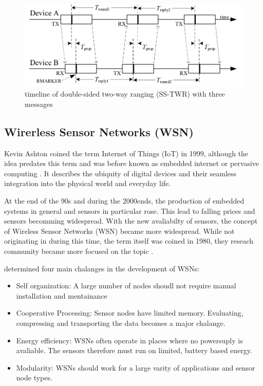 \begin{figure}[ht!]
\centering
\includegraphics[width=\linewidth]{graphics/schematics/TwoSidedRangingThreeMessages.PNG}
\caption{timeline of double-sided two-way ranging (SS-TWR) with three messages\cite{IEEE4z}}
\label{f:ds_twr_3}
\end{figure}


\subsection{Wirerless Sensor Networks (WSN)}
\label{S:WSN}
Kevin Ashton coined the term Internet of Things (IoT) in 1999, although the idea predates this term and was before known as embedded internet or pervasive computing \cite{alaba2024evolution}.
It describes the ubiquity of digital devices and their seamless integration into the physical world and everyday life.



At the end of the 90s and during the 2000ends, the production of embedded systems in general and sensors in particular rose.
This lead to falling prices and sensors becomming widespread.
With the new avaliabilty of sensors, the concept of Wireless Sensor Networks (WSN) became more widespread.
While not originating in during this time, the term itself was coined in 1980, they reseach community became more focused on the topic \cite{jindal2018history}.

\cite{jindal2018history} determined four main chalanges in the development of WSNs:
\begin{itemize}
\item Self organization: A large number of nodes shoudl not require manual installation and mentainance
\item Cooperative Processing: Sensor nodes have limited memory. Evaluating, compressing and transporting the data becomes a major chalange.
\item Energy efficiency: WSNs often operate in places where no powersuply is avaliable. The sensors therefore must run on limited, battery based energy.
\item Modularity: WSNs should work for a large varity of applications and sensor node types.
\end{itemize}

